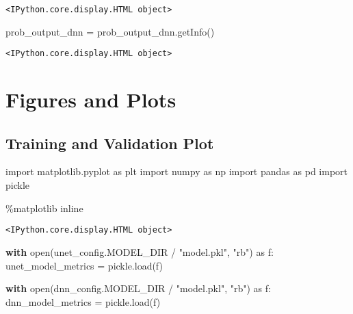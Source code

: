 \documentclass[
  letterpaper,
  DIV=11,
  numbers=noendperiod]{scrreprt}
\newenvironment{Shaded}{\begin{snugshade}}{\end{snugshade}}
\newcommand{\BuiltInTok}[1]{\textcolor[rgb]{0.00,0.23,0.31}{#1}}
\newcommand{\ControlFlowTok}[1]{\textcolor[rgb]{0.00,0.23,0.31}{\textbf{#1}}}
\newcommand{\ImportTok}[1]{\textcolor[rgb]{0.00,0.46,0.62}{#1}}
\newcommand{\NormalTok}[1]{\textcolor[rgb]{0.00,0.23,0.31}{#1}}
\newcommand{\OperatorTok}[1]{\textcolor[rgb]{0.37,0.37,0.37}{#1}}
\newcommand{\StringTok}[1]{\textcolor[rgb]{0.13,0.47,0.30}{#1}}
\begin{document}
\begin{verbatim}
<IPython.core.display.HTML object>
\end{verbatim}

\begin{Shaded}
\begin{Highlighting}[]
\NormalTok{prob\_output\_dnn }\OperatorTok{=}\NormalTok{ prob\_output\_dnn.getInfo()}
\end{Highlighting}
\end{Shaded}

\begin{verbatim}
<IPython.core.display.HTML object>
\end{verbatim}

\section{Figures and Plots}\label{figures-and-plots}

\subsection{Training and Validation
Plot}\label{training-and-validation-plot}

\begin{Shaded}
\begin{Highlighting}[]
\ImportTok{import}\NormalTok{ matplotlib.pyplot }\ImportTok{as}\NormalTok{ plt}
\ImportTok{import}\NormalTok{ numpy }\ImportTok{as}\NormalTok{ np}
\ImportTok{import}\NormalTok{ pandas }\ImportTok{as}\NormalTok{ pd}
\ImportTok{import}\NormalTok{ pickle}

\OperatorTok{\%}\NormalTok{matplotlib inline}
\end{Highlighting}
\end{Shaded}

\begin{verbatim}
<IPython.core.display.HTML object>
\end{verbatim}

\begin{Shaded}
\begin{Highlighting}[]
\ControlFlowTok{with} \BuiltInTok{open}\NormalTok{(unet\_config.MODEL\_DIR }\OperatorTok{/} \StringTok{"model.pkl"}\NormalTok{, }\StringTok{"rb"}\NormalTok{) }\ImportTok{as}\NormalTok{ f:}
\NormalTok{    unet\_model\_metrics }\OperatorTok{=}\NormalTok{ pickle.load(f)}

\ControlFlowTok{with} \BuiltInTok{open}\NormalTok{(dnn\_config.MODEL\_DIR }\OperatorTok{/} \StringTok{"model.pkl"}\NormalTok{, }\StringTok{"rb"}\NormalTok{) }\ImportTok{as}\NormalTok{ f:}
\NormalTok{    dnn\_model\_metrics }\OperatorTok{=}\NormalTok{ pickle.load(f)}
\end{Highlighting}
\end{Shaded}
\end{document}
